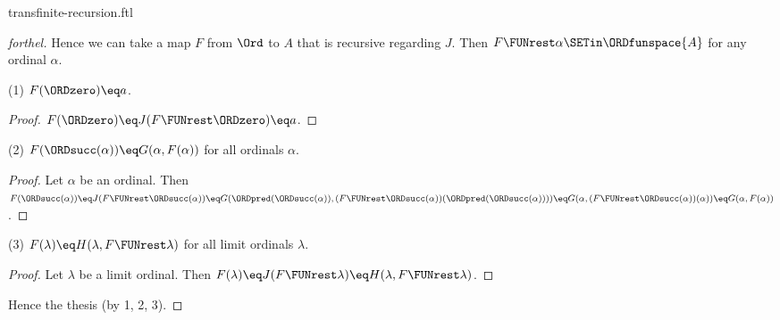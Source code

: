 \documentclass{stex}
\begin{document}
\begin{smodule}{transfinite-recursion.ftl}
\begin{proof}[forthel]
  Hence we can take a map $F$ from $\Ord$ to $A$ that is recursive regarding $J$.
  Then $F \FUNrest \alpha \SETin \ORDfunspace{A}$ for any ordinal $\alpha$.

  (1) $F(\ORDzero) \eq a$.
  \begin{proof}
    $F(\ORDzero)
      \eq J(F \FUNrest \ORDzero)
      \eq a$.
  \end{proof}

  (2) $F(\ORDsucc(\alpha)) \eq G(\alpha, F(\alpha))$ for all ordinals $\alpha$.
  \begin{proof}
    Let $\alpha$ be an ordinal.
    Then $F(\ORDsucc(\alpha))
      \eq J(F \FUNrest \ORDsucc(\alpha))
      \eq G(\ORDpred(\ORDsucc(\alpha)), (F \FUNrest \ORDsucc(\alpha))(\ORDpred(\ORDsucc(\alpha))))
      \eq G(\alpha, (F \FUNrest \ORDsucc(\alpha))(\alpha))
      \eq G(\alpha, F(\alpha))$.
  \end{proof}

  (3) $F(\lambda) \eq H(\lambda, F \FUNrest \lambda)$ for all limit ordinals $\lambda$.
  \begin{proof}
    Let $\lambda$ be a limit ordinal.
    Then $F(\lambda)
      \eq J(F \FUNrest \lambda)
      \eq H(\lambda, F \FUNrest \lambda)$.
  \end{proof}

  Hence the thesis (by 1, 2, 3).
\end{proof}

\printbibliography
{}
\end{smodule}
\end{document}

